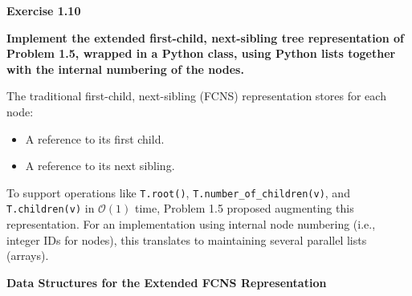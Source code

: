 \documentclass{article}
\begin{document}
\textbf{Exercise 1.10}

\textbf{Implement the extended first-child, next-sibling tree representation of Problem 1.5, wrapped in a Python class, using Python lists together with the internal numbering of the nodes.}

The traditional first-child, next-sibling (FCNS) representation stores for each node:
\begin{itemize}
    \item A reference to its first child.
    \item A reference to its next sibling.
\end{itemize}
To support operations like \texttt{T.root()}, \texttt{T.number\_of\_children(v)}, and \texttt{T.children(v)} in $\mathcal{O}(1)$ time, Problem 1.5 proposed augmenting this representation. For an implementation using internal node numbering (i.e., integer IDs for nodes), this translates to maintaining several parallel lists (arrays).

\textbf{Data Structures for the Extended FCNS Representation}
\end{document}
